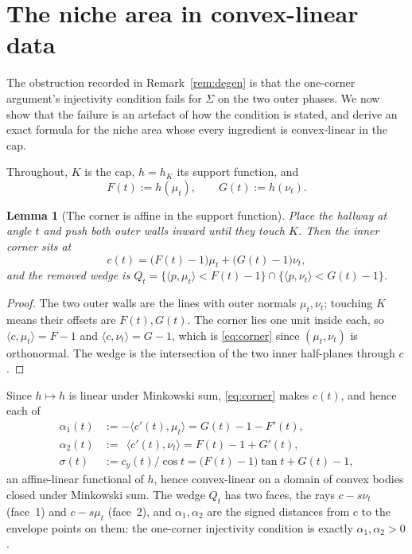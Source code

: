 \documentclass[11pt]{article}
\newtheorem{lemma}[theorem]{Lemma}
\theoremstyle{definition}
\newcommand{\Sig}{\Sigma}
\begin{document}
\section{The niche area in convex-linear data}\label{sec:mamikon}

The obstruction recorded in Remark~\ref{rem:degen} is that the one-corner
argument's injectivity condition fails for $\Sig$ on the two outer phases. We now
show that the failure is an artefact of how the condition is stated, and derive an
exact formula for the niche area whose every ingredient is convex-linear in the
cap.

Throughout, $K$ is the cap, $h=h_K$ its support function, and
\[
  F(t):=h(\mu_t),\qquad G(t):=h(\nu_t).
\]

\begin{lemma}[The corner is affine in the support function]\label{lem:corner}
Place the hallway at angle $t$ and push both outer walls inward until they touch
$K$. Then the inner corner sits at
\begin{equation}\label{eq:corner}
  c(t)=\bigl(F(t)-1\bigr)\mu_t+\bigl(G(t)-1\bigr)\nu_t ,
\end{equation}
and the removed wedge is
$Q_t=\{\langle p,\mu_t\rangle<F(t)-1\}\cap\{\langle p,\nu_t\rangle<G(t)-1\}$.
\end{lemma}

\begin{proof}
The two outer walls are the lines with outer normals $\mu_t,\nu_t$; touching $K$
means their offsets are $F(t),G(t)$. The corner lies one unit inside each, so
$\langle c,\mu_t\rangle=F-1$ and $\langle c,\nu_t\rangle=G-1$, which is
\eqref{eq:corner} since $(\mu_t,\nu_t)$ is orthonormal. The wedge is the
intersection of the two inner half-planes through $c$.
\end{proof}

Since $h\mapsto h$ is linear under Minkowski sum, \eqref{eq:corner} makes $c(t)$,
and hence each of
\begin{align}
  \alpha_1(t)&:=-\langle c'(t),\mu_t\rangle=G(t)-1-F'(t),\label{eq:arm1}\\
  \alpha_2(t)&:=\ \ \langle c'(t),\nu_t\rangle=F(t)-1+G'(t),\label{eq:a2}\\
  \sigma(t)&:=c_y(t)/\cos t=\bigl(F(t)-1\bigr)\tan t+G(t)-1,\label{eq:sig}
\end{align}
an affine-linear functional of $h$, hence convex-linear on a domain of convex
bodies closed under Minkowski sum. The wedge $Q_t$ has two faces, the rays
$c-s\nu_t$ (face~1) and $c-s\mu_t$ (face~2), and $\alpha_1,\alpha_2$ are the
signed distances from $c$ to the envelope points on them: the one-corner
injectivity condition is exactly $\alpha_1,\alpha_2>0$.
\end{document}
